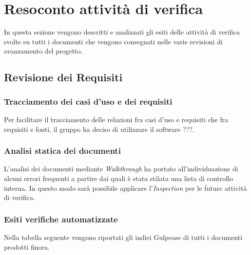 \appendix
\section{Resoconto attività di verifica}
In questa sezione vengono descritti e analizzati gli esiti delle attività
di verifica svolte su tutti i documenti che vengono consegnati nelle varie 
revisioni di avanzamento del progetto.

\subsection{Revisione dei Requisiti}
\subsubsection{Tracciamento dei casi d'uso e dei requisiti}
Per facilitare il tracciamento delle relazioni fra casi d'uso e requisiti che
fra requisiti e fonti, il gruppo ha deciso di utilizzare il software ???.

\subsubsection{Analisi statica dei documenti}
L'analisi dei documenti mediante \textit{Walkthrough}\glo{} ha portato 
all'individuazione di alcuni errori frequenti a partire dai quali è stata 
stilata una lista di controllo interna. In questo modo sarà possibile applicare
l'\textit{Inspection}\glo{} per le future attività di verifica.

\subsubsection{Esiti verifiche automatizzate}
Nella tabella seguente vengono riportati gli indici Gulpease\glo{} di tutti
i documenti prodotti finora.

